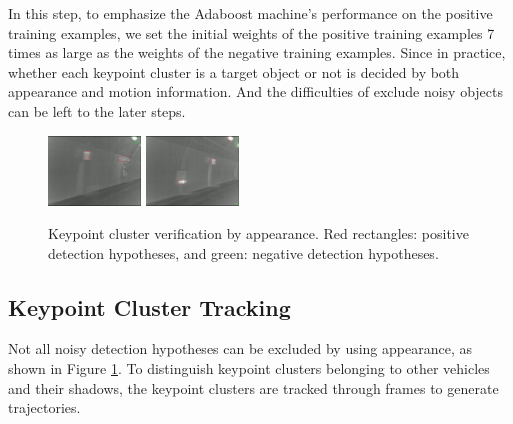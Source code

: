In this step, to emphasize the Adaboost machine's performance on the positive training examples, we set the initial weights of the positive training examples 7 times as large as the weights of the negative training examples.  Since in practice, whether each keypoint cluster is a target object or not is decided by both appearance and motion information. And the difficulties of exclude noisy objects can be left to the later steps.
\begin{figure}[b]
\includegraphics[width=0.22\textwidth,bb=0 0 640 480]{17Rgsimg00039.jpg}
\includegraphics[width=0.22\textwidth,bb=0 0 640 480]{8Rgsimg00028.jpg}
\caption{Keypoint cluster verification by appearance. Red rectangles: positive detection hypotheses, and green: negative detection hypotheses.}
\label{fig:fif}
\end{figure}
\subsection{Keypoint Cluster Tracking}
Not all noisy detection hypotheses can be excluded by using appearance, as shown in Figure \ref{fig:fif}. To distinguish keypoint clusters belonging to other vehicles and their shadows, the keypoint clusters are tracked through frames to generate trajectories.

